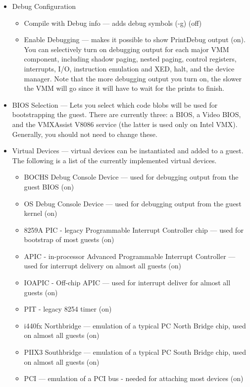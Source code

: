 \documentclass[11pt]{article}
\begin{document}
\begin{itemize}
\begin{itemize}
\end{itemize}
\item Debug Configuration
\begin{itemize}
\item Compile with Debug info --- adds debug symbols (-g)  (off)
\item Enable Debugging --- makes it possible to show PrintDebug output
(on).   You can selectively turn on debugging output for each major
VMM component, including shadow paging, nested paging, control
registers, interrupts, I/O, instruction emulation and XED, halt, and
the device manager.   Note that the more debugging output you turn on,
the slower the VMM will go since it will have to wait for the prints
to finish. 
\end{itemize}
\item BIOS Selection --- Lets you select which code blobs will be
used for bootstrapping the guest.   There are currently three:  a
BIOS, a Video BIOS, and the VMXAssist V8086 service (the latter is used only on
Intel VMX).   Generally, you should not need to change these.
\item Virtual Devices --- virtual devices can be instantiated and
added to a guest.   The following is a list of the currently
implemented virtual devices.
\begin{itemize}
\item BOCHS Debug Console Device --- used for debugging output from
the guest BIOS (on)
\item OS Debug Console Device --- used for debugging output from
the guest kernel (on)
\item 8259A PIC - legacy Programmable Interrupt Controller chip --- used
for bootstrap of most guests (on)
\item APIC - in-processor Advanced Programmable Interrupt Controller --- used
for interrupt delivery on almost all guests (on)
\item IOAPIC - Off-chip APIC  --- used for interrupt deliver for almost
all guests (on)
\item PIT - legacy 8254 timer (on)
\item i440fx Northbridge --- emulation of a typical PC North Bridge
chip, used on almost all guests (on)
\item PIIX3 Southbridge --- emulation of a typical PC South Bridge
chip, used on almost all guests (on)
\item PCI --- emulation of a PCI bus - needed for attaching most
devices (on)   
\begin{itemize}

\end{itemize}
\end{itemize}
\end{itemize}
\end{document}
